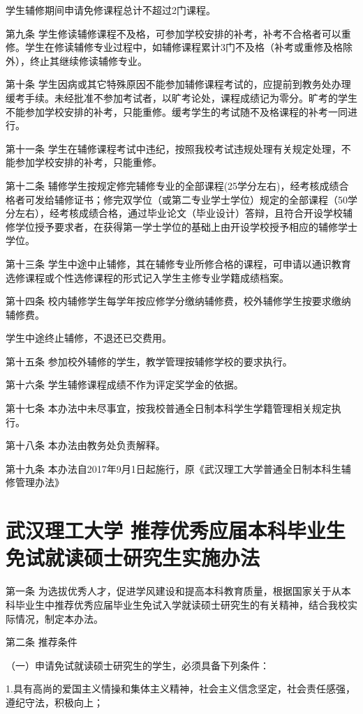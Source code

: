\documentclass[UTF8,12pt,a4paper]{report}
\begin{document}
学生辅修期间申请免修课程总计不超过2门课程。

第九条  学生修读辅修课程不及格，可参加学校安排的补考，补考不合格者可以重修。学生在修读辅修专业过程中，如辅修课程累计3门不及格（补考或重修及格除外），终止其继续修读辅修专业。

第十条  学生因病或其它特殊原因不能参加辅修课程考试的，应提前到教务处办理缓考手续。未经批准不参加考试者，以旷考论处，课程成绩记为零分。旷考的学生不能参加学校安排的补考，只能重修。缓考学生的考试随不及格课程的补考一同进行。

第十一条  学生在辅修课程考试中违纪，按照我校考试违规处理有关规定处理，不能参加学校安排的补考，只能重修。

第十二条  辅修学生按规定修完辅修专业的全部课程(25学分左右)，经考核成绩合格者可发给辅修证书；修完双学位（或第二专业学士学位）规定的全部课程（50学分左右），经考核成绩合格，通过毕业论文（毕业设计）答辩，且符合开设学校辅修学位授予要求者，在获得第一学士学位的基础上由开设学校授予相应的辅修学士学位。

第十三条  学生中途中止辅修，其在辅修专业所修合格的课程，可申请以通识教育选修课程或个性选修课程的形式记入学生主修专业学籍成绩档案。

第十四条  校内辅修学生每学年按应修学分缴纳辅修费，校外辅修学生按要求缴纳辅修费。

学生中途终止辅修，不退还已交费用。

第十五条  参加校外辅修的学生，教学管理按辅修学校的要求执行。

第十六条  学生辅修课程成绩不作为评定奖学金的依据。

第十七条  本办法中未尽事宜，按我校普通全日制本科学生学籍管理相关规定执行。

第十八条  本办法由教务处负责解释。

第十九条  本办法自2017年9月1日起施行，原《武汉理工大学普通全日制本科生辅修管理办法》

		\chapter{武汉理工大学 推荐优秀应届本科毕业生 免试就读硕士研究生实施办法}
第一条 为选拔优秀人才，促进学风建设和提高本科教育质量，根据国家关于从本科毕业生中推荐优秀应届毕业生免试入学就读硕士研究生的有关精神，结合我校实际情况，制定本办法。

第二条 推荐条件

（一）申请免试就读硕士研究生的学生，必须具备下列条件：

1.具有高尚的爱国主义情操和集体主义精神，社会主义信念坚定，社会责任感强，遵纪守法，积极向上；
\end{document}
